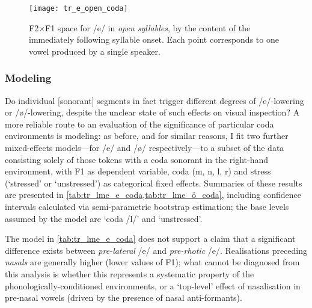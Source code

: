 \begin{figure}[H]
  \centering
  \texttt{[image: tr\_e\_open\_coda]}
  \caption[F2$\times$F1 space for /e/ in open syllables preceding sonorant onsets.]{F2$\times$F1 space for /e/ in \textit{open syllables}, by the content of the immediately following syllable onset. Each point corresponds to one vowel produced by a single speaker.}
  \label{fig:tr_e_open_codas}
\end{figure}

\subsubsection{Modeling}\label{sss:trcodamodel}

Do individual [sonorant] segments in fact trigger different degrees of /e/-lowering or /\o/-lowering, despite the unclear state of such effects on visual inspection? A more reliable route to an evaluation of the significance of particular coda environments is modeling: as before, and for similar reasons, I fit two further mixed-effects models---for /e/ and /\o/ respectively---to a subset of the data consisting solely of those tokens with a coda sonorant in the right-hand environment, with F1 as dependent variable, coda (m, n, l, r) and stress (`stressed' or `unstressed') as categorical fixed effects. Summaries of these results are presented in \cref{tab:tr_lme_e_coda,tab:tr_lme_ö_coda}, including confidence intervals calculated via semi-parametric bootstrap estimation; the base levels assumed by the model are `coda /l/' and `unstressed'.

The model in \cref{tab:tr_lme_e_coda} does not support a claim that a significant difference exists between \emph{pre-lateral} /e/ and \emph{pre-rhotic} /e/. Realisations preceding \emph{nasals} are generally higher (lower values of F1); what cannot be diagnosed from this analysis is whether this represents a systematic property of the phonologically-conditioned environments, or a `top-level' effect of nasalisation in pre-nasal vowels (driven by the presence of nasal anti-formants).

